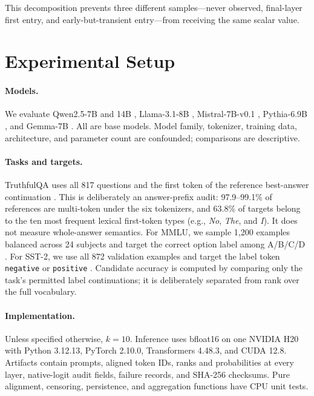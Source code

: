 \documentclass[11pt]{article}
\begin{document}
This decomposition prevents three different samples---never observed, final-layer first entry, and early-but-transient entry---from receiving the same scalar value.

\section{Experimental Setup}
\paragraph{Models.}
We evaluate Qwen2.5-7B and 14B \citep{qwen2024qwen25}, Llama-3.1-8B \citep{dubey2024llama3}, Mistral-7B-v0.1 \citep{jiang2023mistral}, Pythia-6.9B \citep{biderman2023pythia}, and Gemma-7B \citep{gemma2024}. All are base models. Model family, tokenizer, training data, architecture, and parameter count are confounded; comparisons are descriptive.

\paragraph{Tasks and targets.}
TruthfulQA uses all 817 questions and the first token of the reference best-answer continuation \citep{lin2022truthfulqa}. This is deliberately an answer-prefix audit: 97.9--99.1\% of references are multi-token under the six tokenizers, and 63.8\% of targets belong to the ten most frequent lexical first-token types (e.g., \emph{No}, \emph{The}, and \emph{I}). It does not measure whole-answer semantics. For MMLU, we sample 1,200 examples balanced across 24 subjects and target the correct option label among A/B/C/D \citep{hendrycks2021mmlu}. For SST-2, we use all 872 validation examples and target the label token \texttt{negative} or \texttt{positive} \citep{socher2013sst}. Candidate accuracy is computed by comparing only the task's permitted label continuations; it is deliberately separated from rank over the full vocabulary.

\paragraph{Implementation.}
Unless specified otherwise, $k=10$. Inference uses bfloat16 on one NVIDIA H20 with Python 3.12.13, PyTorch 2.10.0, Transformers 4.48.3, and CUDA 12.8. Artifacts contain prompts, aligned token IDs, ranks and probabilities at every layer, native-logit audit fields, failure records, and SHA-256 checksums. Pure alignment, censoring, persistence, and aggregation functions have CPU unit tests.
\end{document}
